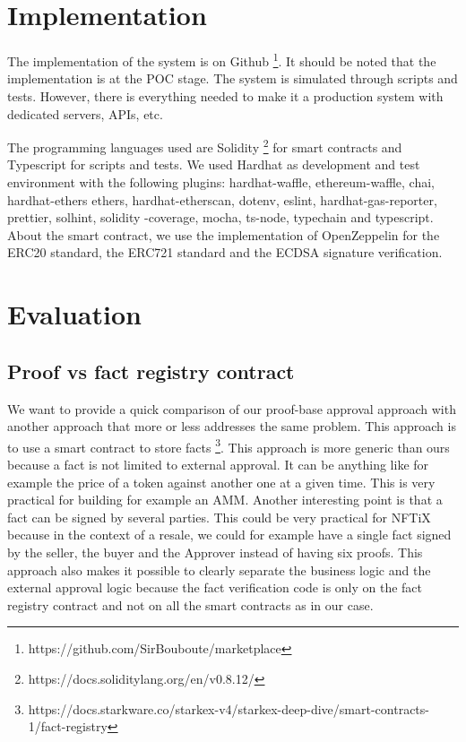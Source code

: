 \documentclass[a4paper,11pt,oneside]{report}
\begin{document}
\chapter{Implementation}
The implementation of the system is on Github \footnote{https://github.com/SirBouboute/marketplace}. It should be noted that the implementation is at the POC stage. The system is simulated through scripts and tests. However, there is everything needed to make it a production system with dedicated servers, APIs, etc.

The programming languages used are Solidity \footnote{https://docs.soliditylang.org/en/v0.8.12/} for smart contracts and Typescript for scripts and tests. We used Hardhat as development and test environment with the following plugins: hardhat-waffle, ethereum-waffle, chai, hardhat-ethers ethers, hardhat-etherscan, dotenv, eslint, hardhat-gas-reporter, prettier, solhint, solidity -coverage, mocha, ts-node, typechain and typescript. About the smart contract, we use the implementation of OpenZeppelin for the ERC20 standard, the ERC721 standard and the ECDSA signature verification.

\chapter{Evaluation}
\section{Proof vs fact registry contract}
We want to provide a quick comparison of our proof-base approval approach with another approach that more or less addresses the same problem. This approach is to use a smart contract to store facts \footnote{https://docs.starkware.co/starkex-v4/starkex-deep-dive/smart-contracts-1/fact-registry}. This approach is more generic than ours because a fact is not limited to external approval. It can be anything like for example the price of a token against another one at a given time. This is very practical for building for example an AMM. Another interesting point is that a fact can be signed by several parties. This could be very practical for NFTiX because in the context of a resale, we could for example have a single fact signed by the seller, the buyer and the Approver instead of having six proofs. This approach also makes it possible to clearly separate the business logic and the external approval logic because the fact verification code is only on the fact registry contract and not on all the smart contracts as in our case.
\end{document}
